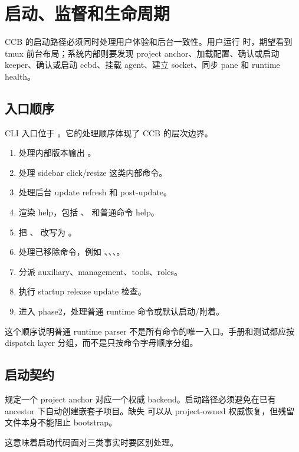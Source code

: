 \chapter{启动、监督和生命周期}

CCB 的启动路径必须同时处理用户体验和后台一致性。用户运行  时，期望看到 tmux 前台布局；系统内部则要发现 project anchor、加载配置、确认或启动 keeper、确认或启动 ccbd、挂载 agent、建立 socket、同步 pane 和 runtime health。

\section{入口顺序}

CLI 入口位于 。它的处理顺序体现了 CCB 的层次边界。

\begin{enumerate}
  \item 处理内部版本输出 。
  \item 处理 sidebar click/resize 这类内部命令。
  \item 处理后台 update refresh 和 post-update。
  \item 渲染 help，包括 、 和普通命令 help。
  \item 把 、 改写为 。
  \item 处理已移除命令，例如 、、、。
  \item 分派 auxiliary、management、tools、roles。
  \item 执行 startup release update 检查。
  \item 进入 phase2，处理普通 runtime 命令或默认启动/附着。
\end{enumerate}

这个顺序说明普通 runtime parser 不是所有命令的唯一入口。手册和测试都应按 dispatch layer 分组，而不是只按命令字母顺序分组。

\section{启动契约}

 规定一个 project anchor 对应一个权威 backend。启动路径必须避免在已有 ancestor  下自动创建嵌套子项目。缺失  可以从 project-owned  权威恢复，但残留文件本身不能阻止 bootstrap。

这意味着启动代码面对三类事实时要区别处理。

